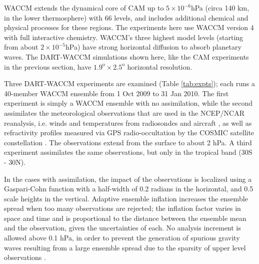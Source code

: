 WACCM extends the dynamical core of CAM up to $5 \times 10^{-6}$hPa (circa 140 km, in the lower thermosphere) with 66 levels, and includes additional chemical and physical processes for these regions. 
The experiments here use WACCM version 4 with full interactive chemistry.
WACCM's three highest model levels (starting from about $2 \times 10^{-5}$hPa) have strong horizontal diffusion to absorb planetary waves. 
The DART-WACCM simulations shown here, like the CAM experiments in the previous section, have $1.9^{\text{o}} \times 2.5^{\text{o}}$ horizontal resolution.


Three DART-WACCM experiments are examined (Table \ref{tab:expts}); 
each runs a 40-member WACCM ensemble from 1 Oct 2009 to 31 Jan 2010. 
The first experiment is simply a WACCM ensemble with no assimilation, while the second 
assimilates the meteorological observations that are used in the NCEP/NCAR reanalysis, i.e. winds and temperatures from radiosondes and aircraft \citep{Saha2010}, as well as refractivity profiles measured via GPS radio-occultation by the COSMIC satellite constellation \citep{Anthes2008}.
The observations extend from the surface to about 2 hPa. 
A third experiment assimilates the same observations, but only in the tropical band (30S - 30N). 

In the cases with assimilation, the impact of the observations is localized using a  
Gaspari-Cohn function \citep{Gaspari1999} with a half-width of 0.2 radians in the horizontal, and 0.5 scale heights in the vertical.  
Adaptive ensemble inflation \citep{Anderson2009tellus} increases the ensemble spread when too many observations are rejected; the inflation factor varies in space and time and is proportional to the distance between the ensemble mean and the observation, given the uncertainties of each.  
No analysis increment is allowed above 0.1 hPa, in order to prevent the generation of spurious gravity waves resulting from a large ensemble spread due to the sparsity of upper level observations \citep{Polavarapu2005b}. 

